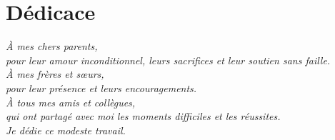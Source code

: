 \chapter*{Dédicace}

\vspace{3cm}

\begin{center}
\begin{minipage}{0.75\textwidth}
\begin{center}

\textit{À mes chers parents,}\\[0.5cm]
\textit{pour leur amour inconditionnel, leurs sacrifices et leur soutien sans faille.}\\[0.5cm]
\textit{À mes frères et sœurs,}\\[0.5cm]
\textit{pour leur présence et leurs encouragements.}\\[0.5cm]
\textit{À tous mes amis et collègues,}\\[0.5cm]
\textit{qui ont partagé avec moi les moments difficiles et les réussites.}\\[1cm]

\textit{Je dédie ce modeste travail.}

\end{center}
\end{minipage}
\end{center}
